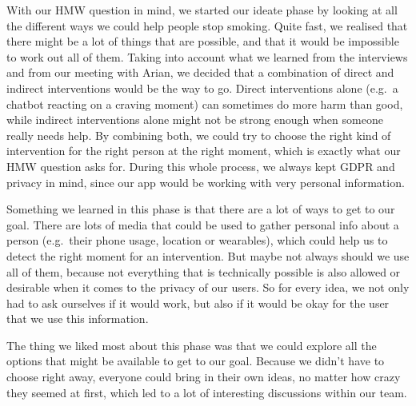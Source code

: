With our HMW question in mind, we started our ideate phase by looking at all the different ways we could help people stop smoking.
Quite fast, we realised that there might be a lot of things that are possible, and that it would be impossible to work out all of them.
Taking into account what we learned from the interviews and from our meeting with Arian, we decided that a combination of direct and indirect interventions would be the way to go.
Direct interventions alone (e.g.\ a chatbot reacting on a craving moment) can sometimes do more harm than good, while indirect interventions alone might not be strong enough when someone really needs help.
By combining both, we could try to choose the right kind of intervention for the right person at the right moment, which is exactly what our HMW question asks for.
During this whole process, we always kept GDPR and privacy in mind, since our app would be working with very personal information.

Something we learned in this phase is that there are a lot of ways to get to our goal.
There are lots of media that could be used to gather personal info about a person (e.g.\ their phone usage, location or wearables), which could help us to detect the right moment for an intervention.
But maybe not always should we use all of them, because not everything that is technically possible is also allowed or desirable when it comes to the privacy of our users.
So for every idea, we not only had to ask ourselves if it would work, but also if it would be okay for the user that we use this information.

The thing we liked most about this phase was that we could explore all the options that might be available to get to our goal.
Because we didn't have to choose right away, everyone could bring in their own ideas, no matter how crazy they seemed at first, which led to a lot of interesting discussions within our team.
